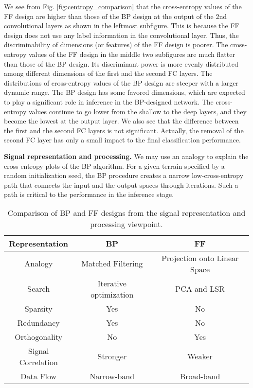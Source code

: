 \documentclass[preprint,12pt]{elsarticle}
\begin{document}
We see from Fig. \ref{fig:centropy_comparison} that the cross-entropy
values of the FF design are higher than those of the BP design at the
output of the 2nd convolutional layers as shown in the leftmost
subfigure. This is because the FF design does not use any label
information in the convolutional layer. Thus, the discriminability of
dimensions (or features) of the FF design is poorer.  The cross-entropy
values of the FF design in the middle two subfigures are much flatter
than those of the BP design. Its discriminant power is more evenly
distributed among different dimensions of the first and the second FC
layers. The distributions of cross-entropy values of the BP design are
steeper with a larger dynamic range. The BP design has some favored
dimensions, which are expected to play a significant role in inference
in the BP-designed network. The cross-entropy values continue to go
lower from the shallow to the deep layers, and they become the lowest at
the output layer.  We also see that the difference between the first and
the second FC layers is not significant.  Actually, the removal of the
second FC layer has only a small impact to the final classification
performance. 

{\bf Signal representation and processing.} We may use an analogy to
explain the cross-entropy plots of the BP algorithm.  For a given
terrain specified by a random initialization seed, the BP procedure
creates a narrow low-cross-entropy path that connects the input and the
output spaces through iterations. Such a path is critical to the
performance in the inference stage. 

\begin{table}[htb]
\begin{center}
\footnotesize
\begin{tabular}{|c|c|c|} \hline
Representation  & BP                        & FF               \\ \hline
Analogy         & Matched Filtering         & Projection onto Linear Space  \\ \hline
Search          & Iterative optimization    & PCA and LSR      \\ \hline
Sparsity        & Yes                       & No               \\ \hline
Redundancy      & Yes                       & No               \\ \hline
Orthogonality   & No                        & Yes              \\ \hline
Signal Correlation     & Stronger           & Weaker           \\ \hline
Data Flow       & Narrow-band               & Broad-band       \\ \hline
\end{tabular}
\end{center}
\caption{Comparison of BP and FF designs from the signal 
representation and processing viewpoint.}\label{table:sp}
\end{table}
\end{document}
